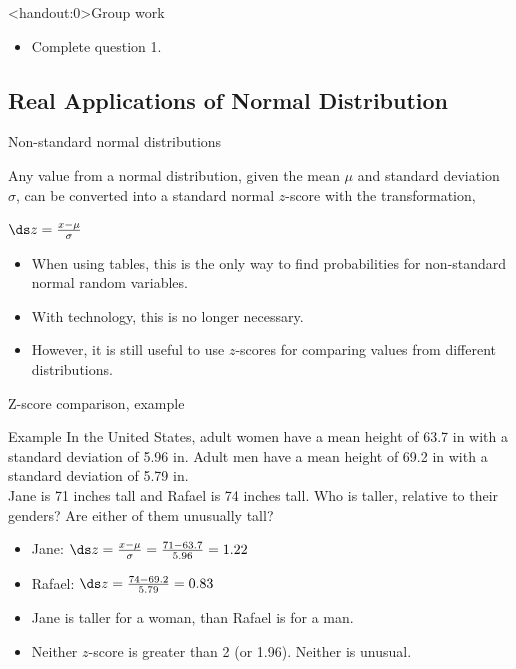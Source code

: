 \documentclass[xcolor=table, handout]{beamer}
\begin{document}
\begin{frame}<handout:0>{Group work}
\begin{block}{}
\large
\begin{itemize}
\item Complete question 1.
\end{itemize}
\end{block}
\end{frame}

\subsection{Real Applications of  Normal Distribution}

\begin{frame}{Non-standard normal distributions}
\begin{block}{}
Any value from a normal distribution, given the mean $\mu$ and standard deviation $\sigma$, can be converted into a standard normal $z$-score with the transformation,\\
\smallskip
{\centering
$\ds z = \frac {x - \mu}{\sigma}$
\par}
\smallskip
\begin{itemize}
\pause\item When using tables, this is the only way to find probabilities for non-standard normal random variables.
\pause\item With technology, this is no longer necessary.
\pause\item However, it is still useful to use $z$-scores for comparing values from different distributions.
\end{itemize}
\end{block}
\end{frame}

\begin{frame}{Z-score comparison, example}
\begin{exampleblock}{Example}
In the United States, adult women have a mean height of 63.7 in with a standard deviation of 5.96 in. Adult men have a mean height of 69.2 in with a standard deviation of 5.79 in.\\
\medskip
Jane is 71 inches tall and Rafael is 74 inches tall. Who is taller, relative to their genders? Are either of them unusually tall?
\begin{itemize}
\pause\item Jane: $\ds z = \frac {x - \mu}{\sigma} = \frac {71 - 63.7}{5.96} = 1.22$
\pause\item Rafael: $\ds z = \frac {74 - 69.2}{5.79} = 0.83$
\pause\item Jane is taller for a woman, than Rafael is for a man.
\pause\item Neither $z$-score is greater than 2 (or 1.96). Neither is unusual.
\end{itemize}
\end{exampleblock}
\end{frame}
\end{document}
